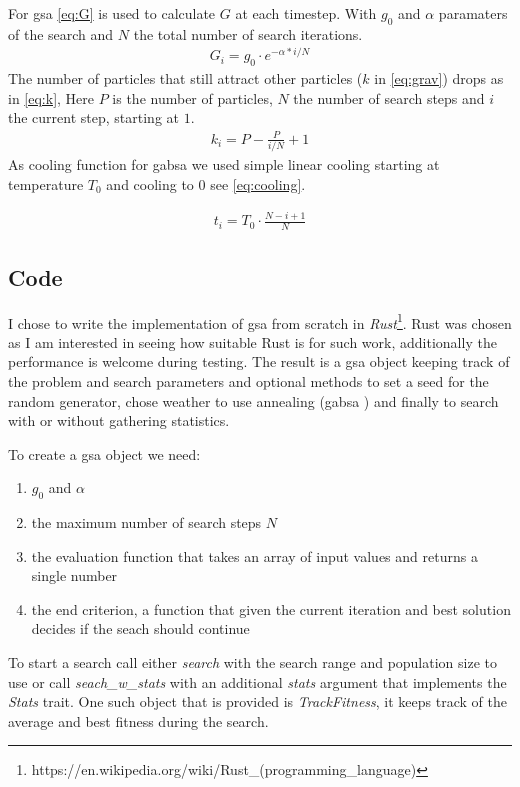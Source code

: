For \ac{gsa} \cref{eq:G} is used to calculate $G$ at each timestep. With $g_0$ and $\alpha$ paramaters of the search and $N$ the total number of search iterations.
%
\begin{align} \label{eq:G}
	G_i = g_0 \cdot e^{- \alpha * i/N}
\end{align}
%
The number of particles that still attract other particles ($k$ in \cref{eq:grav}) drops as in \cref{eq:k}, Here $P$ is the number of particles, $N$ the number of search steps and $i$ the current step, starting at $1$.
%
\begin{align} \label{eq:k}
	k_i = P - \frac{P}{i/N} + 1
\end{align}
%
As cooling function for \ac{gabsa} we used simple linear cooling starting at temperature $T_0$ and cooling to $0$ see \cref{eq:cooling}.

\begin{align} \label{eq:cooling}
	t_i = T_0 \cdot \frac{N - i + 1}{N}
\end{align}
%

\subsection{Code}
I chose to write the implementation of \ac{gsa} from scratch in \textit{Rust}\footnote{https://en.wikipedia.org/wiki/Rust\_(programming\_language)}. Rust was chosen as I am interested in seeing how suitable Rust is for such work, additionally the performance is welcome during testing. The result is a \ac{gsa} object keeping track of the problem and search parameters and optional methods to set a seed for the random generator, chose weather to use annealing (\ac{gabsa} ) and finally to search with or without gathering statistics.

To create a \ac{gsa} object we need:
%
\begin{enumerate}
\item $g_0$ and $\alpha$
\item the maximum number of search steps $N$
\item the evaluation function that takes an array of input values and returns a single number
\item the end criterion, a function that given the current iteration and best solution decides if the seach should continue
\end{enumerate}
%
To start a search call either \textit{search} with the search range and population size to use or call \textit{seach\_w\_stats} with an additional \textit{stats} argument that implements the \textit{Stats} trait. One such object that is provided is \textit{TrackFitness}, it keeps track of the average and best fitness during the search.
